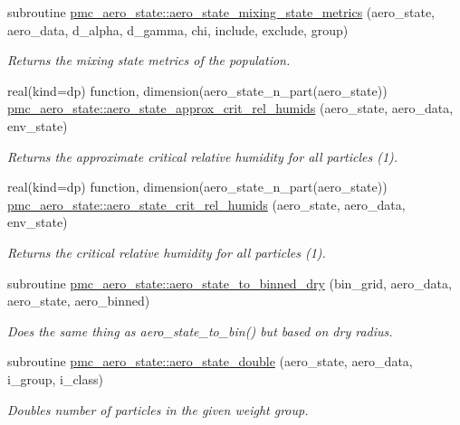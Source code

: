 \begin{DoxyCompactItemize}
subroutine \mbox{\hyperlink{namespacepmc__aero__state_a370d03980bec87029d569a9b9116740d}{pmc\+\_\+aero\+\_\+state\+::aero\+\_\+state\+\_\+mixing\+\_\+state\+\_\+metrics}} (aero\+\_\+state, aero\+\_\+data, d\+\_\+alpha, d\+\_\+gamma, chi, include, exclude, group)
\begin{DoxyCompactList}\small\item\em Returns the mixing state metrics of the population. \end{DoxyCompactList}\item 
real(kind=dp) function, dimension(aero\+\_\+state\+\_\+n\+\_\+part(aero\+\_\+state)) \mbox{\hyperlink{namespacepmc__aero__state_a24a909f4a78590222a3d1f940e2e6863}{pmc\+\_\+aero\+\_\+state\+::aero\+\_\+state\+\_\+approx\+\_\+crit\+\_\+rel\+\_\+humids}} (aero\+\_\+state, aero\+\_\+data, env\+\_\+state)
\begin{DoxyCompactList}\small\item\em Returns the approximate critical relative humidity for all particles (1). \end{DoxyCompactList}\item 
real(kind=dp) function, dimension(aero\+\_\+state\+\_\+n\+\_\+part(aero\+\_\+state)) \mbox{\hyperlink{namespacepmc__aero__state_a1618326e97d290803c642af677073d9c}{pmc\+\_\+aero\+\_\+state\+::aero\+\_\+state\+\_\+crit\+\_\+rel\+\_\+humids}} (aero\+\_\+state, aero\+\_\+data, env\+\_\+state)
\begin{DoxyCompactList}\small\item\em Returns the critical relative humidity for all particles (1). \end{DoxyCompactList}\item 
subroutine \mbox{\hyperlink{namespacepmc__aero__state_a9618d3e95a4e97e71b154586a2c8bc25}{pmc\+\_\+aero\+\_\+state\+::aero\+\_\+state\+\_\+to\+\_\+binned\+\_\+dry}} (bin\+\_\+grid, aero\+\_\+data, aero\+\_\+state, aero\+\_\+binned)
\begin{DoxyCompactList}\small\item\em Does the same thing as aero\+\_\+state\+\_\+to\+\_\+bin() but based on dry radius. \end{DoxyCompactList}\item 
subroutine \mbox{\hyperlink{namespacepmc__aero__state_a061271c7cf7c3592bb385c1b7bfbedfc}{pmc\+\_\+aero\+\_\+state\+::aero\+\_\+state\+\_\+double}} (aero\+\_\+state, aero\+\_\+data, i\+\_\+group, i\+\_\+class)
\begin{DoxyCompactList}\small\item\em Doubles number of particles in the given weight group. \end{DoxyCompactList}\item 

\end{DoxyCompactItemize}
